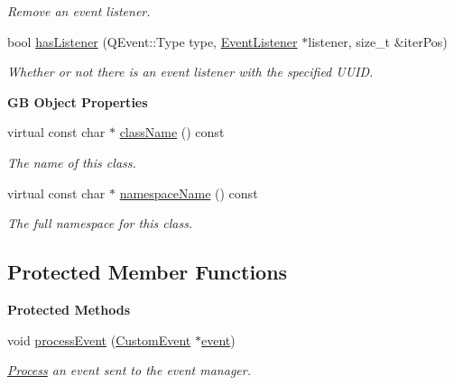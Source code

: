 \begin{Indent}
\begin{DoxyCompactItemize}
\begin{DoxyCompactList}\small\item\em Remove an event listener. \end{DoxyCompactList}\item 
\mbox{\label{classrev_1_1_event_manager_a83f5c7765f8186474bb5f934406e0417}} 
bool \mbox{\hyperlink{classrev_1_1_event_manager_a83f5c7765f8186474bb5f934406e0417}{has\+Listener}} (Q\+Event\+::\+Type type, \mbox{\hyperlink{classrev_1_1_event_listener}{Event\+Listener}} $\ast$listener, size\+\_\+t \&iter\+Pos)
\begin{DoxyCompactList}\small\item\em Whether or not there is an event listener with the specified U\+U\+ID. \end{DoxyCompactList}\end{DoxyCompactItemize}
\end{Indent}
\begin{Indent}\textbf{ GB Object Properties}\par
\begin{DoxyCompactItemize}
\item 
virtual const char $\ast$ \mbox{\hyperlink{classrev_1_1_event_manager_a3999d64126b1b5e0d8d4a47636bfe4c5}{class\+Name}} () const
\begin{DoxyCompactList}\small\item\em The name of this class. \end{DoxyCompactList}\item 
virtual const char $\ast$ \mbox{\hyperlink{classrev_1_1_event_manager_a5188a25a9b785d841c39aefafd5f391e}{namespace\+Name}} () const
\begin{DoxyCompactList}\small\item\em The full namespace for this class. \end{DoxyCompactList}\end{DoxyCompactItemize}
\end{Indent}
\subsection*{Protected Member Functions}
\begin{Indent}\textbf{ Protected Methods}\par
\begin{DoxyCompactItemize}
\item 
\mbox{\label{classrev_1_1_event_manager_a07e6e5ffacb36df9d774e3416630d190}} 
void \mbox{\hyperlink{classrev_1_1_event_manager_a07e6e5ffacb36df9d774e3416630d190}{process\+Event}} (\mbox{\hyperlink{classrev_1_1_custom_event}{Custom\+Event}} $\ast$\mbox{\hyperlink{classrev_1_1_event_manager_afc28f0f7fc5b3e34836001a1f2fb0148}{event}})
\begin{DoxyCompactList}\small\item\em \mbox{\hyperlink{classrev_1_1_process}{Process}} an event sent to the event manager. \end{DoxyCompactList}\end{DoxyCompactItemize}
\end{Indent}
